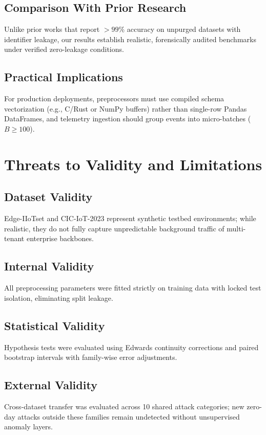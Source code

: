 \documentclass[10pt,journal,twocolumn]{IEEEtran}
\begin{document}
\subsection{Comparison With Prior Research}
Unlike prior works that report $>99\%$ accuracy on unpurged datasets with identifier leakage, our results establish realistic, forensically audited benchmarks under verified zero-leakage conditions.

\subsection{Practical Implications}
For production deployments, preprocessors must use compiled schema vectorization (e.g., C/Rust or NumPy buffers) rather than single-row Pandas DataFrames, and telemetry ingestion should group events into micro-batches ($B \ge 100$).

\section{Threats to Validity and Limitations}

\subsection{Dataset Validity}
Edge-IIoTset and CIC-IoT-2023 represent synthetic testbed environments; while realistic, they do not fully capture unpredictable background traffic of multi-tenant enterprise backbones.

\subsection{Internal Validity}
All preprocessing parameters were fitted strictly on training data with locked test isolation, eliminating split leakage.

\subsection{Statistical Validity}
Hypothesis tests were evaluated using Edwards continuity corrections and paired bootstrap intervals with family-wise error adjustments.

\subsection{External Validity}
Cross-dataset transfer was evaluated across 10 shared attack categories; new zero-day attacks outside these families remain undetected without unsupervised anomaly layers.
\end{document}
